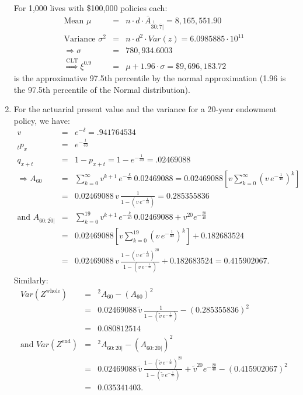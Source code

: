 \documentclass[11pt,fleqn,oneside]{book}
\begin{document}
\begin{enumerate}
For 1,000 lives with \$100,000 policies each:
\begin{eqnarray*}
\text{Mean }\mu &=& n\cdot d \cdot {\bar{A}_{\stackrel{1}{30}:\overline{7}|}} = 8,165,551.90\\
\text{Variance } \sigma^2 &=& n\cdot d^2 \cdot Var(z) = 6.0985885\cdot 10^{11}\\
\Rightarrow \sigma &=& 780,934.6003\\
\stackrel{\text{CLT}}{\Rightarrow} \xi^{0.9} &=& \mu + 1.96\cdot \sigma = \$ 9,696,183.72
\end{eqnarray*}
is the approximative 97.5th percentile by the normal approximation (1.96 is the 97.5th percentile of the Normal distribution).
\item For the actuarial present value and the variance for a 20-year endowment policy, we have:
\begin{eqnarray*}
v &=& e^{-\delta} = .941764534\\
{_tp_x} &=& e^{-\frac{t}{40}}\\
q_{x+t} &=& 1 - p_{x+t} = 1 - e^{-\frac{1}{40}} = .02469088\\
\Rightarrow {A_{60}} &=& \sum_{k=0}^{\infty} v^{k+1}\,e^{-\frac{k}{40}}\,0.02469088 = 0.02469088\left[v\sum_{k=0}^{\infty} \left(v\,e^{-\frac{1}{40}}\right)^k\right] \\
&=& 0.02469088\, v\,\frac{1 }{1 -  \left(v\,e^{-\frac{1}{40}}\right)}  = 0.285355836 \\
\text{and } {A_{60:\overline{20}|}} &=& \sum_{k=0}^{19} v^{k+1}\,e^{-\frac{k}{40}}\,0.02469088 + v^{20}e^{-\frac{20}{40}}\\
&=& 0.02469088\left[v\sum_{k=0}^{19} \left(v\,e^{-\frac{1}{40}}\right)^k\right] + 0.182683524\\
&=& 0.02469088\, v\,\frac{1 -  \left(v\,e^{-\frac{1}{40}}\right)^{20}}{1 -  \left(v\,e^{-\frac{1}{40}}\right)} +
 0.182683524 = 0.415902067.
 \end{eqnarray*}
 Similarly:
 \begin{eqnarray*}
 Var(Z^{\text{whole}})&=&   {^2A_{60}} - \left( A_{60} \right)^2\\
 &=&  0.02469088\, \tilde{v}\,\frac{1 }{1 -  \left(\tilde{v}\,e^{-\frac{1}{40}}\right)}  - (0.285355836)^2\\
 &=& 0.080812514\\ 
 \text{and }Var(Z^{\text{end}})&=&   {^2A_{60:\overline{20}|}} - \left( {A_{60:\overline{20}|}} \right)^2\\
 &=&   0.02469088\, \tilde{v}\,\frac{1 -  \left(\tilde{v}\,e^{-\frac{1}{40}}\right)^{20}}{1 -  \left(\tilde{v}\,e^{-\frac{1}{40}}\right)}  + \tilde{v}^{20}e^{-\frac{20}{40}} - (0.415902067)^2\\
 &=& 0.035341403.
\end{eqnarray*}

\end{enumerate}
\normalsize
\end{document}
